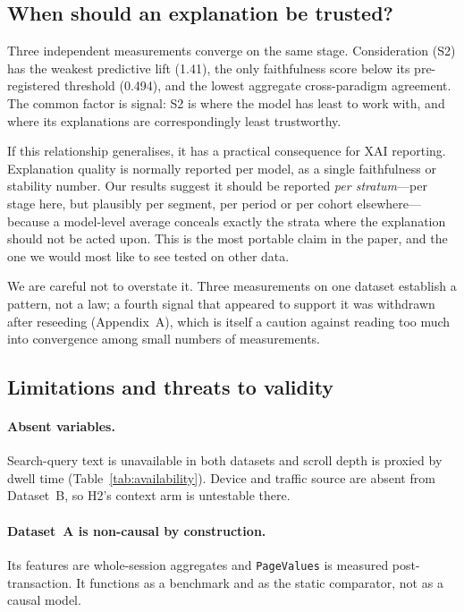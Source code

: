\documentclass[review,3p,times,authoryear]{elsarticle}   %
\begin{document}
\subsection{When should an explanation be trusted?}

Three independent measurements converge on the same stage. Consideration (S2) has
the weakest predictive lift (1.41), the only faithfulness score below its
pre-registered threshold (0.494), and the lowest aggregate cross-paradigm agreement.
The common factor is signal: S2 is where the model has least to work with, and where
its explanations are correspondingly least trustworthy.

If this relationship generalises, it has a practical consequence for XAI reporting.
Explanation quality is normally reported per model, as a single faithfulness or
stability number. Our results suggest it should be reported \emph{per stratum}---per
stage here, but plausibly per segment, per period or per cohort elsewhere---because
a model-level average conceals exactly the strata where the explanation should not be
acted upon. This is the most portable claim in the paper, and the one we would most
like to see tested on other data.

We are careful not to overstate it. Three measurements on one dataset establish a
pattern, not a law; a fourth signal that appeared to support it was withdrawn after
reseeding (Appendix~A), which is itself a caution against reading too much into
convergence among small numbers of measurements.

\subsection{Limitations and threats to validity}
\label{sec:limitations}

\paragraph{Absent variables.} Search-query text is unavailable in both datasets and
scroll depth is proxied by dwell time (Table~\ref{tab:availability}). Device and
traffic source are absent from Dataset~B, so H2's context arm is untestable there.

\paragraph{Dataset~A is non-causal by construction.} Its features are whole-session
aggregates and \texttt{PageValues} is measured post-transaction. It functions as a
benchmark and as the static comparator, not as a causal model.
\end{document}
